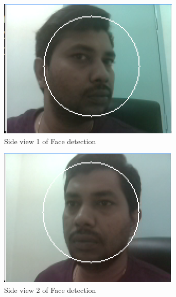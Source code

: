 \documentclass[sigconf]{acmart}
\begin{document}
\begin{figure}[ht!]
  \includegraphics[width=\columnwidth]{images/Face-detect-sideview1.png}
  \caption{Side view 1 of Face detection}
\end{figure}

\begin{figure}[ht!]
  \includegraphics[width=\columnwidth]{images/Face-detect-sideview2.png}
  \caption{Side view 2 of Face detection}
\end{figure}
\end{document}
